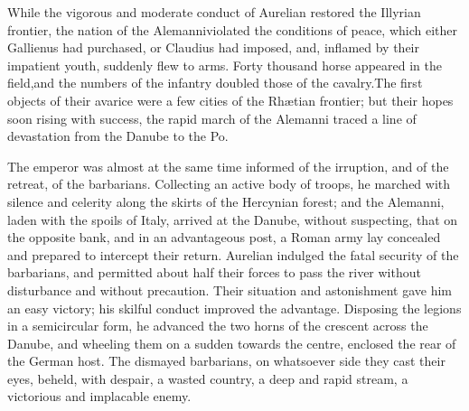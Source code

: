 

While the vigorous and moderate conduct of Aurelian restored the
Illyrian frontier, the nation of the Alemanni\footnotemark[25] violated the
conditions of peace, which either Gallienus had purchased, or
Claudius had imposed, and, inflamed by their impatient youth,
suddenly flew to arms. Forty thousand horse appeared in the
field,\footnotemark[26] and the numbers of the infantry doubled those of the
cavalry.\footnotemark[27] The first objects of their avarice were a few cities
of the Rhætian frontier; but their hopes soon rising with
success, the rapid march of the Alemanni traced a line of
devastation from the Danube to the Po.\footnotemark[28]





The emperor was almost at the same time informed of the
irruption, and of the retreat, of the barbarians. Collecting an
active body of troops, he marched with silence and celerity along
the skirts of the Hercynian forest; and the Alemanni, laden with
the spoils of Italy, arrived at the Danube, without suspecting,
that on the opposite bank, and in an advantageous post, a Roman
army lay concealed and prepared to intercept their return.
Aurelian indulged the fatal security of the barbarians, and
permitted about half their forces to pass the river without
disturbance and without precaution. Their situation and
astonishment gave him an easy victory; his skilful conduct
improved the advantage. Disposing the legions in a semicircular
form, he advanced the two horns of the crescent across the
Danube, and wheeling them on a sudden towards the centre,
enclosed the rear of the German host. The dismayed barbarians, on
whatsoever side they cast their eyes, beheld, with despair, a
wasted country, a deep and rapid stream, a victorious and
implacable enemy.

